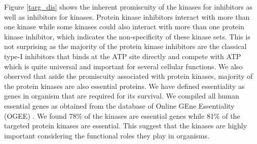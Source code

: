 \documentclass[a4paper, 11pt]{report}
\begin{document}
Figure \ref{targ_dis} shows the inherent promiscuity of the kinases for inhibitors as well as inhibitors for kinases. Protein kinase inhibitors interact with more than one kinase  while some kinases could also interact with more than one protein kinase inhibitor, which indicates the non-specificity of these kinase sets. This is not surprising as the majority of the protein kinase inhibitors are the classical type-I inhibitors that binds at the ATP site directly and compete with ATP which is quite universal and important for several cellular functions.
We also observed that aside the promiscuity associated with protein kinases, majority of the protein kinases are also essential proteins. We have defined essentiality as genes in organism that are required for its survival. We compiled all human essential genes as obtained from the database of Online GEne Essentiality (OGEE) \cite{chen2017ogee}. We found  78\% of the kinases are essential genes while 81\% of the targeted protein kinases are essential. This suggest that the kinases are highly important considering the functional roles they play in organisms.
\end{document}
